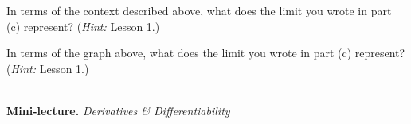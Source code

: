 \documentclass[10pt]{article}
\begin{document}
{    \item In terms of the context described above, what does the limit you wrote in part (c) represent? ({\it Hint:} Lesson 1.)\\

    
    \item In terms of the graph above, what does the limit you wrote in part (c) represent?  ({\it Hint:} Lesson 1.)\\

}

\newpage%

\,\\[-0.5in]

{\bf\color{blue} Mini-lecture.}  {\it Derivatives \& Differentiability}\\
\end{document}
